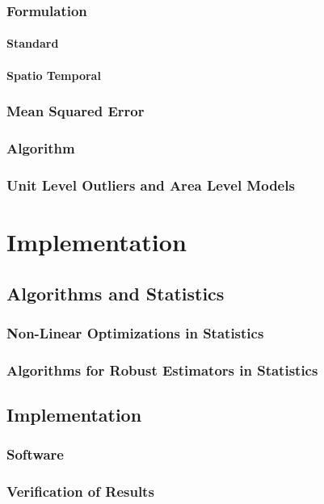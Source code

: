 \section{Formulation}
\subsection{Standard}
\subsection{Spatio Temporal}
\section{Mean Squared Error}
\section{Algorithm}


\section{Unit Level Outliers and Area Level Models}

\part{Implementation}\label{part:implementation}

\chapter{Algorithms and Statistics}
\section{Non-Linear Optimizations in Statistics}
\section{Algorithms for Robust Estimators in Statistics}

\chapter{Implementation}\label{part:implementation}
\section{Software}
\section{Verification of Results}
